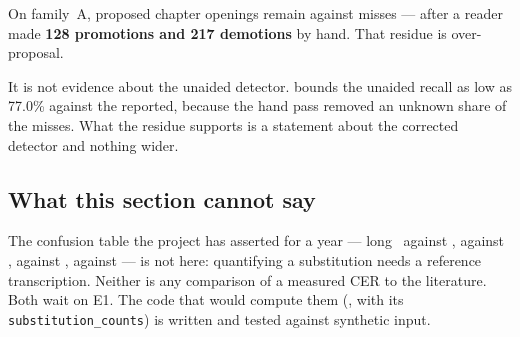 On family~A, \structSpuriousA{} proposed chapter openings remain against
\structMissingA{} misses --- after a reader made \textbf{128 promotions and 217
demotions} by hand. That residue is over-proposal.

It is not evidence about the unaided detector.
 bounds the
unaided recall as low as 77.0\% against the \structRecallHandCheckedA{}
reported, because the hand pass removed an unknown share of the misses. What
the residue supports is a statement about the corrected detector and nothing
wider.

\subsection{What this section cannot say}

The confusion table the project has asserted for a year --- long~
against ,  against ,  against ,
 against  --- is not here: quantifying a substitution needs a
reference transcription. Neither is any comparison of a measured CER to the
literature. Both wait on E1. The code that would compute them
(, with its \texttt{substitution\_counts}) is
written and tested against synthetic input.
